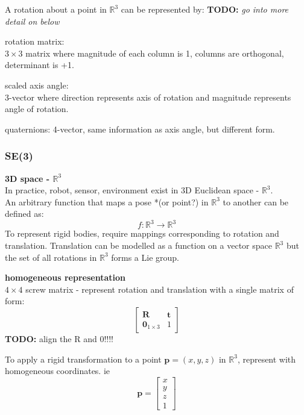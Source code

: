 		A rotation about a point in $\mathbb{R}^3$ can be represented by: \textbf{TODO:} \textit{go into more detail on below}
		
		rotation matrix:\\
		$3 \times 3$ matrix where magnitude of each column is 1, columns are orthogonal, determinant is +1.
		
		scaled axis angle:\\
		3-vector where direction represents axis of rotation and magnitude represents angle of rotation.		
		
		quaternions:
		4-vector, same information as axis angle, but different form.\\
		
	\subsubsection{\textbf{SE}(3)}		
		\textbf{3D space - $\mathbb{R}^3$}\\
		In practice, robot, sensor, environment exist in 3D Euclidean space - $\mathbb{R}^3$.\\
		An arbitrary function that maps a pose *(or point?) in $\mathbb{R}^3$ to another can be defined as:
		\begin{equation}
		f: \mathbb{R}^3 \rightarrow \mathbb{R}^3
		\end{equation}
		To represent rigid bodies, require mappings corresponding to rotation and translation. Translation can be modelled as a function on a vector space $\mathbb{R}^3$ but the set of all rotations in $\mathbb{R}^3$ forms a Lie group. 

		\textbf{homogeneous representation}\\
		$4 \times 4$ screw matrix - represent rotation and translation with a single matrix of form:\\
		
		\begin{equation}
				\begin{bmatrix}
				  \mathbf{R}	&	\mathbf{t} \\
				  \textbf{0}_{1 \times 3}		& 	1 
				\end{bmatrix}
		\end{equation}
		\textbf{TODO:} align the R and 0!!!!

		To apply a rigid transformation to a point $\textbf{p} = (x,y,z) $ in $\mathbb{R}^3$, represent with homogeneous coordinates. ie
		\begin{equation}
		\mathbf{p} = 
		\begin{bmatrix}
				  x	\\
				  y	\\
				  z	\\
				  1	
		\end{bmatrix}
		\end{equation}
	
